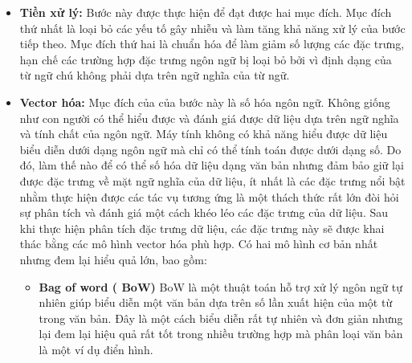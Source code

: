 \documentclass[14pt]{extreport}
\begin{document}
\begin{itemize}
    \item \textbf{Tiền xử lý:} Bước này được thực hiện để đạt được hai mục đích. Mục đích thứ nhất là loại bỏ các yếu tố gây nhiễu và làm tăng khả năng xử lý của bước tiếp theo. Mục đích thứ hai là chuẩn hóa để làm giảm số lượng các đặc trưng, hạn chế các trường hợp đặc trưng ngôn ngữ bị loại bỏ bởi vì định dạng của từ ngữ chú không phải dựa trên ngữ nghĩa của từ ngữ.
    \item \textbf{Vector hóa:} Mục đích của của bước này là số hóa ngôn ngữ. Không giống như con người có thể hiểu được và đánh giá được dữ liệu dựa trên ngữ nghĩa và tính chất của ngôn ngữ. Máy tính không có khả năng hiểu được dữ liệu biểu diễn dưới dạng ngôn ngữ mà chỉ có thể tính toán được dưới dạng số. Do đó, làm thế nào để có thể số hóa dữ liệu dạng văn bản nhưng đảm bảo giữ lại được đặc trưng về mặt ngữ nghĩa của dữ liệu, ít nhất là các đặc trưng nổi bật nhằm thực hiện được các tác vụ tương ứng là một thách thức rất lớn đòi hỏi sự phân tích và đánh giá một cách khéo léo các đặc trưng của dữ liệu. Sau khi thực hiện phân tích đặc trưng dữ liệu, các đặc trưng này sẽ được khai thác bằng các mô hình vector hóa phù hợp. Có hai mô hình cơ bản nhất nhưng đem lại hiểu quả lớn, bao gồm:
    \begin{itemize}
        \item \textbf{Bag of word ( BoW)} BoW là một thuật toán hỗ trợ xử lý ngôn ngữ tự nhiên giúp biểu diễn một văn bản dựa trên số lần xuất hiện của một từ trong văn bản. Đây là một cách biểu diễn rất tự nhiên và đơn giản nhưng lại đem lại hiệu quả rất tốt trong nhiều trường hợp mà phân loại văn bản là một ví dụ điển hình.
        

\end{itemize}
\end{itemize}
\end{document}

